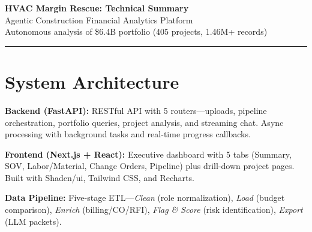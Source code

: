\documentclass[11pt,a4paper]{article}
\begin{document}
\begin{center}
    {\LARGE \textbf{HVAC Margin Rescue: Technical Summary}} \\[0.3em]
    {\large Agentic Construction Financial Analytics Platform} \\[0.2em]
    {\small Autonomous analysis of \$6.4B portfolio (405 projects, 1.46M+ records)}
\end{center}

\vspace{-0.5em}
\hrule
\vspace{0.8em}

\section{System Architecture}

\begin{center}
\end{center}

\textbf{Backend (FastAPI):} RESTful API with 5 routers---uploads, pipeline orchestration, portfolio queries, project analysis, and streaming chat. Async processing with background tasks and real-time progress callbacks.

\textbf{Frontend (Next.js + React):} Executive dashboard with 5 tabs (Summary, SOV, Labor/Material, Change Orders, Pipeline) plus drill-down project pages. Built with Shadcn/ui, Tailwind CSS, and Recharts.

\textbf{Data Pipeline:} Five-stage ETL---\textit{Clean} (role normalization), \textit{Load} (budget comparison), \textit{Enrich} (billing/CO/RFI), \textit{Flag \& Score} (risk identification), \textit{Export} (LLM packets).
\end{document}
